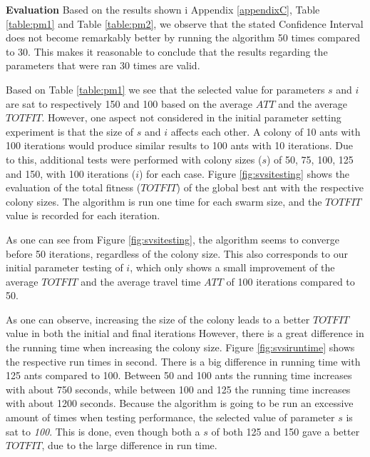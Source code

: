 \textbf{Evaluation}
\newline
Based on the results shown i Appendix \ref{appendixC}, Table \vref{table:pm1} and Table \vref{table:pm2}, we observe that the stated Confidence Interval does not become remarkably better by running the algorithm 50 times compared to 30. This makes it reasonable to conclude that the results regarding the parameters that were ran 30 times are valid. 
\newline

Based on Table \vref{table:pm1} we see that the selected value for parameters $s$ and $i$ are sat to respectively 150 and 100 based on the average $ATT$ and the average $TOTFIT$. However, one aspect not considered in the initial parameter setting experiment is that the size of $s$ and $i$ affects each other. A colony of 10 ants with 100 iterations would produce similar results to 100 ants with 10 iterations. Due to this, additional tests were performed with colony sizes ($s$) of 50, 75, 100, 125 and 150, with 100 iterations ($i$) for each case. Figure \vref{fig:svsitesting} shows the evaluation of the total fitness ($TOTFIT$) of the global best ant with the respective colony sizes. The algorithm is run one time for each swarm size, and the $TOTFIT$ value is recorded for each iteration. 

As one can see from Figure \vref{fig:svsitesting}, the algorithm seems to converge before 50 iterations, regardless of the colony size. This also corresponds to our initial parameter testing of $i$, which only shows a small improvement of the average $TOTFIT$ and the average travel time $ATT$ of 100 iterations compared to 50. 

As one can observe, increasing the size of the colony leads to a better $TOTFIT$ value in both the initial and final iterations However, there is a great difference in the running time when increasing the colony size. Figure \vref{fig:svsiruntime} shows the respective run times in second. There is a big difference in running time with 125 ants compared to 100. Between 50 and 100 ants the running time increases with about 750 seconds, while between 100 and 125 the running time increases with about 1200 seconds. Because the algorithm is going to be run an excessive amount of times when testing performance, the selected value of parameter $s$ is sat to \textit{100}. This is done, even though both a $s$ of both 125 and 150 gave a better $TOTFIT$, due to the large difference in run time. %

